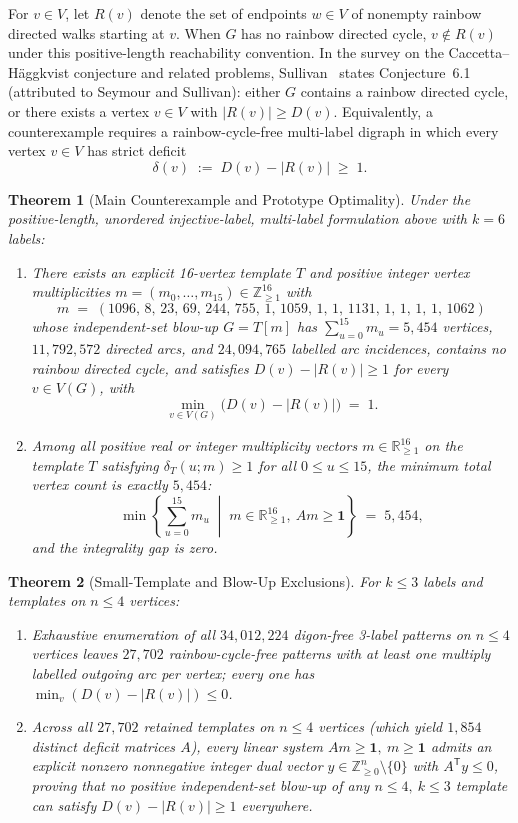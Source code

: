 \documentclass[10pt,reqno]{amsart}
\newtheorem{theorem}{Theorem}[section]
\theoremstyle{definition}
\begin{document}
For $v\in V$, let $R(v)$ denote the set of endpoints $w\in V$ of nonempty rainbow directed walks starting at $v$. When $G$ has no rainbow directed cycle, $v\notin R(v)$ under this positive-length reachability convention. In the survey on the Caccetta--H\"aggkvist conjecture and related problems, Sullivan~\cite{Sullivan2006} states Conjecture~6.1 (attributed to Seymour and Sullivan): either $G$ contains a rainbow directed cycle, or there exists a vertex $v\in V$ with $|R(v)|\ge D(v)$. Equivalently, a counterexample requires a rainbow-cycle-free multi-label digraph in which every vertex $v\in V$ has strict deficit
\[
  \delta(v) \;:=\; D(v) - |R(v)| \;\ge\; 1.
\]

\begin{theorem}[Main Counterexample and Prototype Optimality]\label{thm:main}
Under the positive-length, unordered injective-label, multi-label formulation above with $k=6$ labels:
\begin{enumerate}[label=\textup{(\arabic*)}]
  \item There exists an explicit 16-vertex template $T$ and positive integer vertex multiplicities $m=(m_0,\dots,m_{15})\in\mathbb{Z}_{\ge 1}^{16}$ with
  \[
    m \;=\; (1096,\,8,\,23,\,69,\,244,\,755,\,1,\,1059,\,1,\,1,\,1131,\,1,\,1,\,1,\,1,\,1062)
  \]
  whose independent-set blow-up $G=T[m]$ has $\sum_{u=0}^{15} m_u = 5{,}454$ vertices, $11{,}792{,}572$ directed arcs, and $24{,}094{,}765$ labelled arc incidences, contains no rainbow directed cycle, and satisfies $D(v)-|R(v)|\ge 1$ for every $v\in V(G)$, with
  \[
    \min_{v\in V(G)}\bigl(D(v)-|R(v)|\bigr) \;=\; 1.
  \]
  \item Among all positive real or integer multiplicity vectors $m\in\mathbb{R}_{\ge 1}^{16}$ on the template $T$ satisfying $\delta_T(u;m)\ge 1$ for all $0\le u\le 15$, the minimum total vertex count is exactly $5{,}454$:
  \[
    \min\left\{\sum_{u=0}^{15} m_u \;\middle|\; m\in\mathbb{R}_{\ge 1}^{16},\ A m \ge \mathbf{1}\right\} \;=\; 5{,}454,
  \]
  and the integrality gap is zero.
\end{enumerate}
\end{theorem}

\begin{theorem}[Small-Template and Blow-Up Exclusions]\label{thm:boundaries}
For $k\le 3$ labels and templates on $n\le 4$ vertices:
\begin{enumerate}[label=\textup{(\arabic*)}]
  \item Exhaustive enumeration of all $34{,}012{,}224$ digon-free 3-label patterns on $n\le 4$ vertices leaves $27{,}702$ rainbow-cycle-free patterns with at least one multiply labelled outgoing arc per vertex; every one has $\min_v(D(v)-|R(v)|)\le 0$.
  \item Across all $27{,}702$ retained templates on $n\le 4$ vertices (which yield $1{,}854$ distinct deficit matrices $A$), every linear system $A m\ge \mathbf{1},\ m\ge \mathbf{1}$ admits an explicit nonzero nonnegative integer dual vector $y\in\mathbb{Z}_{\ge 0}^n\setminus\{0\}$ with $A^{\mathsf T}y\le 0$, proving that no positive independent-set blow-up of any $n\le 4,\ k\le 3$ template can satisfy $D(v)-|R(v)|\ge 1$ everywhere.
\end{enumerate}
\end{theorem}
\end{document}
